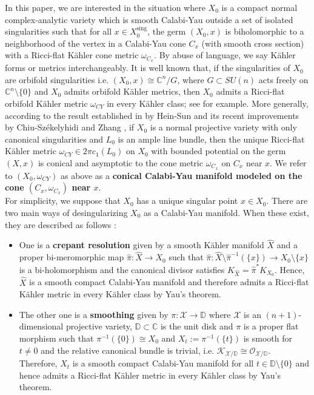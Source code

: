 \documentclass[a4paper,11pt]{article}
\def\C{\mathbb{C}}
\begin{document}
In this paper, we are interested in the situation where $X_0$ is a compact normal complex-analytic variety which is smooth Calabi-Yau outside a set of isolated singularities such that for all $x \in X_0^{\text{sing}}$, the germ $(X_0,x)$ is biholomorphic to a neighborhood of the vertex in a Calabi-Yau cone $C_x$ (with smooth cross section) with a Ricci-flat Kähler cone metric $\omega_{C_x}$. By abuse of language, we say Kähler forms or metrics interchangeably. It is well known that, if the singularities of $X_0$ are orbifold singularities i.e. $(X_0,x) \cong \C^n / G$, where $G \subset SU(n)$ acts freely on $\C^n \setminus \{ 0\}$ and $X_0$ admits orbifold Kähler metrics, then $X_0$ admits a Ricci-flat orbifold Kähler metric $\omega_{CY}$ in every Kähler class; see \cite{joyce2000compact} for example. More generally, according to the result established in \cite{hein_calabi-yau_2017} by Hein-Sun and its recent improvements by Chiu-Székelyhidi \cite{ChiuSzekelyhidi} and Zhang \cite{zhang2024polynomial}, if $X_0$ is a normal projective variety with only canonical singularities and $L_0$ is an ample line bundle, then the unique Ricci-flat Kähler metric $\omega_{CY} \in 2 \pi c_1(L_0)$ on $X_0$ with bounded potential on the germ $(X,x)$ is conical and asymptotic to the cone metric $\omega_{C_x}$ on $C_x$ near $x$. We refer to $(X_0, \omega_{CY})$ as above as a \textbf{conical Calabi-Yau manifold modeled on the cone $(C_x, \omega_{C_x})$ near $x$}. \\

For simplicity, we suppose that $X_0$ has a unique singular point $x \in X_0$. There are two main ways of desingularizing $X_0$ as a Calabi-Yau manifold. When these exist, they are described as follows :
\begin{itemize}
\item One is a \textbf{crepant resolution} given by a smooth Kähler manifold $\hat{X}$ and a proper bi-meromorphic map $\hat{\pi} : \hat X \rightarrow X_0$ such that $\hat{\pi} : \hat{X} \setminus \hat{\pi}^{-1} ( \{ x\}) \rightarrow X_0 \setminus \{x \} $ is a bi-holomorphism and the canonical divisor satisfies $K_{\hat{X}} = \hat{\pi}^{*} K_{X_0}$. Hence, $\hat{X}$ is a smooth compact Calabi-Yau manifold and therefore admits a Ricci-flat Kähler metric in every Kähler class by Yau's theorem.
\item The other one is a \textbf{smoothing} given by $\pi : \mathcal{X} \rightarrow \mathbb{D}$ where $\mathcal{X}$ is an $(n+1)$-dimensional projective variety, $\mathbb{D} \subset \C$ is the unit disk and $\pi$ is a proper flat morphism such that $\pi^{-1}(\{ 0\}) \cong X_0$ and $X_{t} := \pi^{-1}(\{ t\}) $ is smooth for $t \neq 0$ and the relative canonical bundle is trivial, i.e. $\mathcal{K}_{\mathcal{X}/ \mathbb{D}} \cong \mathcal{O}_{\mathcal{X}/\mathbb{D}}$. Therefore, $X_t$ is a smooth compact Calabi-Yau manifold for all $t \in \mathbb{D} \setminus \{0\}$ and hence admits a Ricci-flat Kähler metric in every Kähler class by Yau's theorem. 
\end{itemize}
\end{document}
